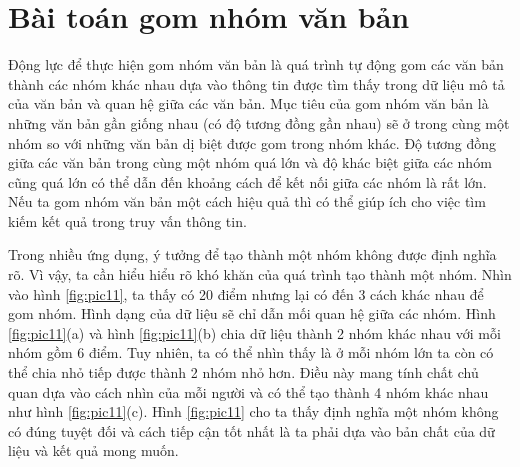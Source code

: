 \section{Bài toán gom nhóm văn bản}
Động lực để thực hiện gom nhóm văn bản là quá trình tự động gom các văn bản thành các nhóm khác nhau dựa vào thông tin được tìm thấy trong dữ liệu mô tả của văn bản và quan hệ giữa các văn bản.
Mục tiêu của gom nhóm văn bản là những văn bản gần giống nhau (có độ tương đồng gần nhau) sẽ ở trong cùng một nhóm so với những văn bản dị biệt được gom trong nhóm khác.
Độ tương đồng giữa các văn bản trong cùng một nhóm quá lớn và độ khác biệt giữa các nhóm cũng quá lớn có thể dẫn đến khoảng cách để kết nối giữa các nhóm là rất lớn.
Nếu ta gom nhóm văn bản một cách hiệu quả thì có thể giúp ích cho việc tìm kiếm kết quả trong truy vấn thông tin.

Trong nhiều ứng dụng, ý tưởng để tạo thành một nhóm không được định nghĩa rõ.
Vì vậy, ta cần hiểu hiểu rõ khó khăn của quá trình tạo thành một nhóm.
Nhìn vào hình \ref{fig:pic11}, ta thấy có 20 điểm nhưng lại có đến 3 cách khác nhau để gom nhóm.
Hình dạng của dữ liệu sẽ chỉ dẫn mối quan hệ giữa các nhóm.
Hình \ref{fig:pic11}(a) và hình \ref{fig:pic11}(b) chia dữ liệu thành 2 nhóm khác nhau với mỗi nhóm gồm 6 điểm.
Tuy nhiên, ta có thể nhìn thấy là ở mỗi nhóm lớn ta còn có thể chia nhỏ tiếp được thành 2 nhóm nhỏ hơn.
Điều này mang tính chất chủ quan dựa vào cách nhìn của mỗi người và có thể tạo thành 4 nhóm khác nhau như hình \ref{fig:pic11}(c).
Hình \ref{fig:pic11} cho ta thấy định nghĩa một nhóm không có đúng tuyệt đối và cách tiếp cận tốt nhất là ta phải dựa vào bản chất của dữ liệu và kết quả mong muốn.

